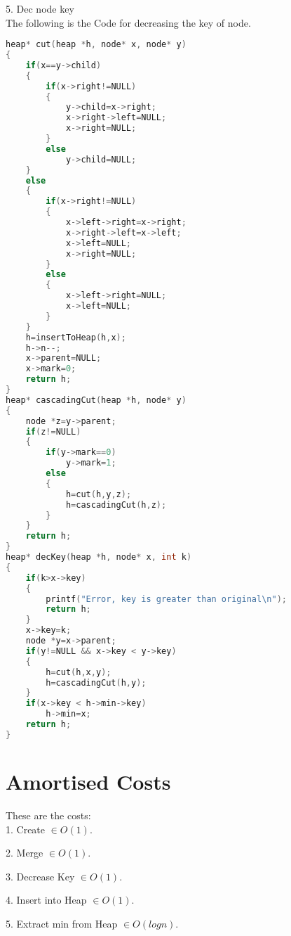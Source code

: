 \documentclass{article}
\begin{document}
5. Dec node key\\
The following is the Code for decreasing the key of node.
\begin{lstlisting}[language=c, caption=decrease]
heap* cut(heap *h, node* x, node* y)
{
    if(x==y->child)
    {
        if(x->right!=NULL)
        {
            y->child=x->right;
            x->right->left=NULL;
            x->right=NULL;
        }
        else
            y->child=NULL;
    }
    else
    {
        if(x->right!=NULL)
        {
            x->left->right=x->right;
            x->right->left=x->left;
            x->left=NULL;
            x->right=NULL;
        }
        else
        {
            x->left->right=NULL;
            x->left=NULL;
        }
    }
    h=insertToHeap(h,x);
    h->n--;
    x->parent=NULL;
    x->mark=0;
    return h;
}
heap* cascadingCut(heap *h, node* y)
{
    node *z=y->parent;
    if(z!=NULL)
    {
        if(y->mark==0)
            y->mark=1;
        else
        {
            h=cut(h,y,z);
            h=cascadingCut(h,z);
        }
    }
    return h;
}
heap* decKey(heap *h, node* x, int k)
{
    if(k>x->key)
    {
        printf("Error, key is greater than original\n");
        return h;
    }
    x->key=k;
    node *y=x->parent;
    if(y!=NULL && x->key < y->key)
    {
        h=cut(h,x,y);
        h=cascadingCut(h,y);
    }
    if(x->key < h->min->key)
        h->min=x;
    return h;
}
\end{lstlisting}

\section{Amortised Costs}

These are the costs: \\

1. Create  $\in O(1)$.

2. Merge  $\in O(1)$.

3. Decrease Key  $\in O(1)$.

4. Insert into Heap  $\in O(1)$.

5. Extract min from Heap  $\in O(log n)$.
\end{document}
